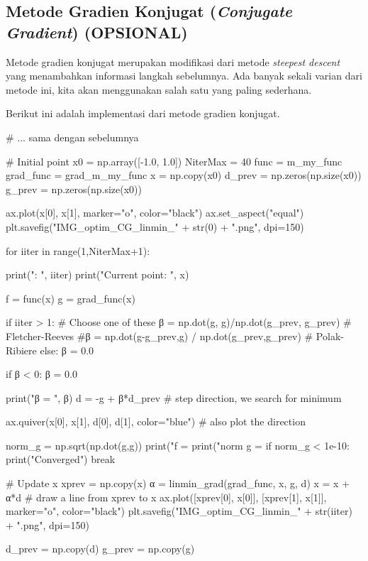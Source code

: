 \subsection{Metode Gradien Konjugat (\textit{Conjugate Gradient}) (OPSIONAL)}

Metode gradien konjugat merupakan modifikasi dari metode \textit{steepest descent} yang
menambahkan informasi langkah sebelumnya. Ada banyak sekali varian dari metode ini, kita
akan menggunakan salah satu yang paling sederhana.

Berikut ini adalah implementasi dari metode gradien konjugat.
\begin{pythoncode}
# ... sama dengan sebelumnya

# Initial point
x0 = np.array([-1.0, 1.0])
NiterMax = 40
func = m_my_func
grad_func = grad_m_my_func
x = np.copy(x0)
d_prev = np.zeros(np.size(x0))
g_prev = np.zeros(np.size(x0))

ax.plot(x[0], x[1], marker="o", color="black")
ax.set_aspect("equal")
plt.savefig("IMG_optim_CG_linmin_" + str(0) + ".png", dpi=150)

for iiter in range(1,NiterMax+1):

    print("\nIteration: ", iiter)
    print("Current point: ", x)

    f = func(x)
    g = grad_func(x)

    if iiter > 1:
        # Choose one of these
        β = np.dot(g, g)/np.dot(g_prev, g_prev) # Fletcher-Reeves
        #β = np.dot(g-g_prev,g) / np.dot(g_prev,g_prev) # Polak-Ribiere
    else:
        β = 0.0

    if β < 0:
        β = 0.0

    print("β = ", β)
    d = -g + β*d_prev # step direction, we search for minimum

    ax.quiver(x[0], x[1], d[0], d[1], color="blue") # also plot the direction

    norm_g = np.sqrt(np.dot(g,g))
    print("f      = %
    print("norm g = %
    if norm_g < 1e-10:
        print("Converged")
        break

    # Update x
    xprev = np.copy(x)
    α = linmin_grad(grad_func, x, g, d)
    x = x + α*d 
    # draw a line from xprev to x
    ax.plot([xprev[0], x[0]], [xprev[1], x[1]], marker="o", color="black")
    plt.savefig("IMG_optim_CG_linmin_" + str(iiter) + ".png", dpi=150)

    d_prev = np.copy(d)
    g_prev = np.copy(g)
\end{pythoncode}

